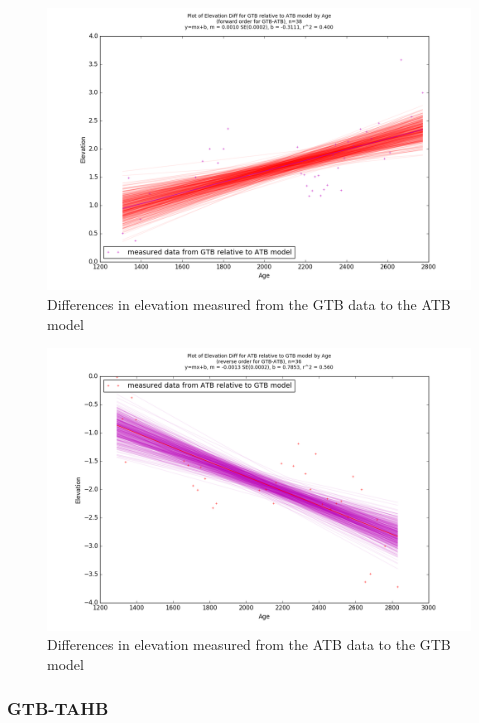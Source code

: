 \begin{figure}[H]
	\includegraphics[width=0.9\linewidth]{data/bothNonZero/withinSeventyFivePercent/gias/theGIA_GTB_relative_to_ATB.png}
	\caption{Differences in elevation measured from the GTB data to the ATB model}
	\label{fig:gias_GTBxATB}
\end{figure}
\newpage


\begin{figure}[H]
	\includegraphics[width=0.9\linewidth]{data/bothNonZero/withinSeventyFivePercent/gias/theGIA_ATB_relative_to_GTB.png}
	\caption{Differences in elevation measured from the ATB data to the GTB model}
	\label{fig:gias_ATBxGTB}
\end{figure}
\newpage








\subsubsection{GTB-TAHB}

